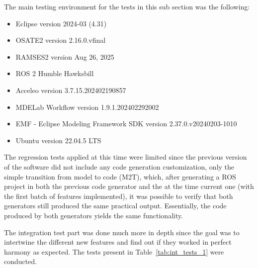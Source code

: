 The main testing environment for the tests in this sub section was the following:

\begin{itemize} 
	\item Eclipse version 2024-03 (4.31)
	\item OSATE2 version 2.16.0.vfinal
	\item RAMSES2 version Aug 26, 2025
	\item ROS 2 Humble Hawksbill
	\item Acceleo version 3.7.15.202402190857
	\item MDELab Workflow version 1.9.1.202402292002
	\item EMF - Eclipse Modeling Framework SDK version 2.37.0.v20240203-1010
	\item Ubuntu version 22.04.5 LTS
\end{itemize}

The regression tests applied at this time were limited since the previous version of the software did not include any code generation customization, only the simple transition from model to code (\gls{M2T}), which, after generating a \gls{ROS} project in both the previous code generator and the at the time current one (with the first batch of features implemented), it was possible to verify that both generators still produced the same practical output. Essentially, the code produced by both generators yields the same functionality.

The integration test part was done much more in depth since the goal was to intertwine the different new features and find out if they worked in perfect harmony as expected. The tests present in Table~\ref{tab:int_tests_1} were conducted.


